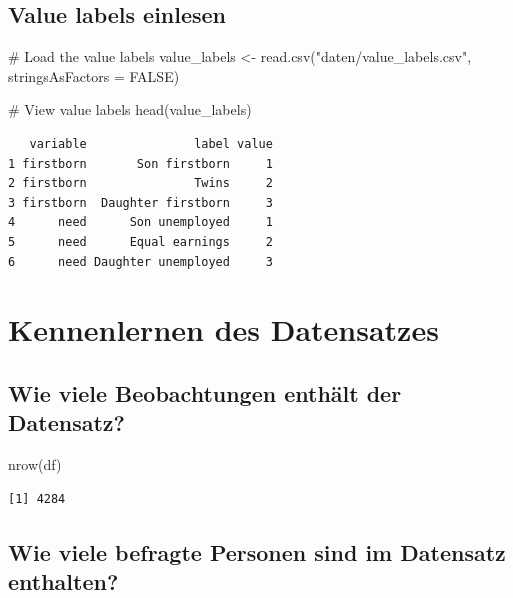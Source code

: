 \documentclass[
  letterpaper,
  DIV=11,
  numbers=noendperiod]{scrartcl}
\newenvironment{Shaded}{\begin{snugshade}}{\end{snugshade}}
\newcommand{\AttributeTok}[1]{\textcolor[rgb]{0.40,0.45,0.13}{#1}}
\newcommand{\CommentTok}[1]{\textcolor[rgb]{0.37,0.37,0.37}{#1}}
\newcommand{\ConstantTok}[1]{\textcolor[rgb]{0.56,0.35,0.01}{#1}}
\newcommand{\FunctionTok}[1]{\textcolor[rgb]{0.28,0.35,0.67}{#1}}
\newcommand{\NormalTok}[1]{\textcolor[rgb]{0.00,0.23,0.31}{#1}}
\newcommand{\OtherTok}[1]{\textcolor[rgb]{0.00,0.23,0.31}{#1}}
\newcommand{\StringTok}[1]{\textcolor[rgb]{0.13,0.47,0.30}{#1}}
\begin{document}
\subsection{Value labels einlesen}\label{value-labels-einlesen}

\begin{Shaded}
\begin{Highlighting}[]
\CommentTok{\# Load the value labels}
\NormalTok{value\_labels }\OtherTok{\textless{}{-}} \FunctionTok{read.csv}\NormalTok{(}\StringTok{"daten/value\_labels.csv"}\NormalTok{, }\AttributeTok{stringsAsFactors =} \ConstantTok{FALSE}\NormalTok{)}

\CommentTok{\# View value labels}
\FunctionTok{head}\NormalTok{(value\_labels)}
\end{Highlighting}
\end{Shaded}

\begin{verbatim}
   variable               label value
1 firstborn       Son firstborn     1
2 firstborn               Twins     2
3 firstborn  Daughter firstborn     3
4      need      Son unemployed     1
5      need      Equal earnings     2
6      need Daughter unemployed     3
\end{verbatim}

\section{Kennenlernen des
Datensatzes}\label{kennenlernen-des-datensatzes}

\subsection{Wie viele Beobachtungen enthält der
Datensatz?}\label{wie-viele-beobachtungen-enthuxe4lt-der-datensatz}

\begin{Shaded}
\begin{Highlighting}[]
\FunctionTok{nrow}\NormalTok{(df)}
\end{Highlighting}
\end{Shaded}

\begin{verbatim}
[1] 4284
\end{verbatim}

\subsection{Wie viele befragte Personen sind im Datensatz
enthalten?}\label{wie-viele-befragte-personen-sind-im-datensatz-enthalten}
\end{document}
